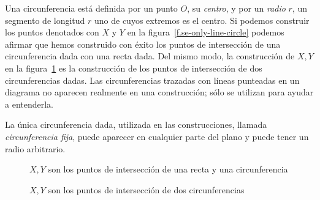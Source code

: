 Una circunferencia está definida por un punto $O$, su \emph{centro}, y por un \emph{radio} $r$, un segmento de longitud $r$ uno de cuyos extremos es el centro. Si podemos construir los puntos denotados con $X$ y $Y$ en la figura~\ref{f.se-only-line-circle} podemos afirmar que hemos construido con éxito los puntos de intersección de una circunferencia dada con una recta dada. Del mismo modo, la construcción de $X,Y$ en la figura~\ref{f.se-only-two-circles} es la construcción de los puntos de intersección de dos circunferencias dadas. Las  circunferencias trazadas
 con líneas punteadas en un diagrama no aparecen realmente en una construcción; sólo se utilizan para ayudar a entenderla.

La única circunferencia dada, utilizada en las construcciones, llamada \emph{circunferencia fija}, puede aparecer en cualquier parte del plano y puede tener un radio arbitrario.

\begin{figure}[t]
\begin{minipage}{.45\textwidth}
\begin{center}
\caption{$X,Y$ son los puntos de intersección de una recta y una circunferencia}\label{f.se-only-line-circle}
\end{center}
\end{minipage}
\hfill
\begin{minipage}{.45\textwidth}
\begin{center}
\caption{$X,Y$ son los puntos de intersección de dos circunferencias}\label{f.se-only-two-circles}
\end{center}
\end{minipage}
\end{figure}

